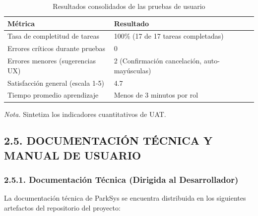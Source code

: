 \begin{table}[htbp]
\caption{Resultados consolidados de las pruebas de usuario}
\label{tab:resultados_uat_v2}
\begin{tabular}{@{}p{8cm} p{7cm}@{}}
\toprule
\textbf{Métrica} & \textbf{Resultado} \\
\midrule
Tasa de completitud de tareas & 100\% (17 de 17 tareas completadas) \\
Errores críticos durante pruebas & 0 \\
Errores menores (sugerencias UX) & 2 (Confirmación cancelación, auto-mayúsculas) \\
Satisfacción general (escala 1-5) & 4.7 \\
Tiempo promedio aprendizaje & Menos de 3 minutos por rol \\
\bottomrule
\end{tabular}
\par\vspace{0.2cm}
\textit{Nota.} Sintetiza los indicadores cuantitativos de UAT.
\end{table}

\clearpage\subsection{2.5. DOCUMENTACIÓN TÉCNICA Y MANUAL DE USUARIO}

\subsubsection{2.5.1. Documentación Técnica (Dirigida al Desarrollador)}

La documentación técnica de ParkSys se encuentra distribuida en los siguientes artefactos del repositorio del proyecto:




